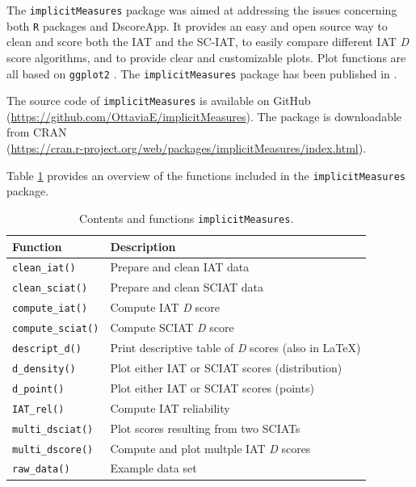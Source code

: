 \documentclass[12pt]{book}
\begin{document}
The \verb*|implicitMeasures| package \cite{implicit, implicitMeasures} was aimed at addressing the issues concerning both \verb*|R| packages and DscoreApp. It provides an easy and open source way to clean and score both the IAT and the SC-IAT, to easily compare different IAT \emph{D} score algorithms, and to provide clear and customizable plots. Plot functions are all based on \verb*|ggplot2| \cite{ggplot2}. The \verb*|implicitMeasures| package has been published in .


The source code of \verb*|implicitMeasures| is available on GitHub \\ (\url{https://github.com/OttaviaE/implicitMeasures}). The package is downloadable from CRAN \\ (\url{https://cran.r-project.org/web/packages/implicitMeasures/index.html}).

Table \ref{tab:implicitmeasures} provides an overview of the functions included in the \verb*|implicitMeasures| package.
%
\begin{table}[h!]
	\centering \onehalfspacing
	\caption{\label{tab:implicitmeasures} Contents and functions \texttt{implicitMeasures}.}
	\begin{tabular}{p{5cm} p{9cm}}
		\hline
		Function & Description \\
		\hline

\verb*|clean_iat()|& Prepare and clean IAT data\\
\verb*|clean_sciat()|& Prepare and clean SCIAT data\\
\verb*|compute_iat()|& Compute IAT \emph{D} score \\
\verb*|compute_sciat()|& Compute SCIAT \emph{D} score \\
\verb*|descript_d()|& Print descriptive table of \emph{D} scores (also in \LaTeX) \\
\verb*|d_density()|& Plot either IAT or SCIAT scores (distribution) \\
\verb*|d_point()|& Plot either IAT or SCIAT scores (points) \\
\verb*|IAT_rel()|& Compute IAT reliability \\
\verb*|multi_dsciat()|& Plot scores resulting from two SCIATs\\
\verb*|multi_dscore()|& Compute and plot multple IAT \emph{D} scores\\
\verb*|raw_data()|& Example data set \\
\bottomrule
	\end{tabular}
\end{table}
\end{document}
